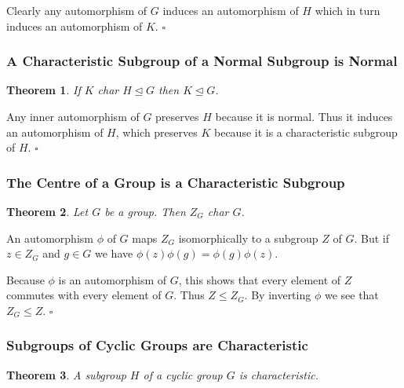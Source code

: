 \documentclass[10pt]{article}
\newtheorem{theorem}{Theorem}[section]
\newenvironment{proof}[1][Proof]{\begin{trivlist}
\item[\hskip \labelsep {\itshape #1}]}{\end{trivlist}}
\begin{document}
\begin{proof}
Clearly any automorphism of $G$ induces an automorphism of $H$ which in turn induces an automorphism of $K$. $\square$
\end{proof}

\subsubsection{A Characteristic Subgroup of a Normal Subgroup is Normal}

\begin{theorem}
If $K$ char $H \mathrel{\unlhd} G$ then $K \mathrel{\unlhd} G$.
\end{theorem}

\begin{proof}
Any inner automorphism of $G$ preserves $H$ because it is normal. Thus it induces an automorphism of $H$, which preserves $K$ because it is a characteristic subgroup of $H$. $\square$
\end{proof}

\subsubsection{The Centre of a Group is a Characteristic Subgroup}

\begin{theorem}
Let $G$ be a group. Then $Z_G$ char $G$.
\end{theorem}

\begin{proof}
An automorphism $\phi$ of $G$ maps $Z_G$ isomorphically to a subgroup $Z$ of $G$. But if $z \in Z_G$ and $g \in G$ we have $\phi(z)\phi(g) = \phi(g)\phi(z)$.

Because $\phi$ is an automorphism of $G$, this shows that every element of $Z$ commutes with every element of $G$. Thus $Z \leq Z_G$. By inverting $\phi$ we see that $Z_G \leq Z$. $\square$
\end{proof}

\subsubsection{Subgroups of Cyclic Groups are Characteristic}

\begin{theorem}
A subgroup $H$ of a cyclic group $G$ is characteristic.
\end{theorem}
\end{document}
